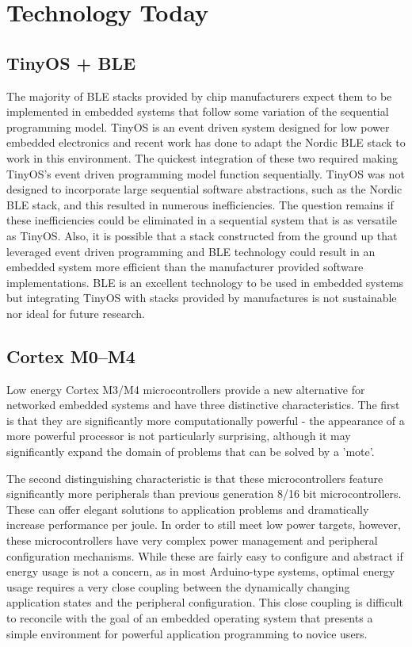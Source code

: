 \section{Technology Today}

\subsection{TinyOS + BLE}

The majority of BLE stacks provided by chip manufacturers expect them to be
implemented in embedded systems that follow some variation of the sequential
programming model.  TinyOS is an event driven system designed for low power
embedded electronics and recent work has done to adapt the Nordic BLE stack to
work in this environment. The quickest integration of these two required
making TinyOS’s event driven programming model function sequentially.  TinyOS
was not designed to incorporate large sequential software abstractions, such
as the Nordic BLE stack, and this resulted in numerous inefficiencies.  The
question remains if these inefficiencies could be eliminated in a sequential
system that is as versatile as TinyOS.  Also, it is possible that a stack
constructed from the ground up that leveraged event driven programming and BLE
technology could result in an embedded system more efficient than the
manufacturer provided software implementations.  BLE is an excellent
technology to be used in embedded systems but integrating TinyOS with stacks
provided by manufactures is not sustainable nor ideal for future research.

\subsection{Cortex M0--M4}

Low energy Cortex M3/M4 microcontrollers provide a new alternative for
networked embedded systems and have three distinctive characteristics. The
first is that they are significantly more computationally powerful - the
appearance of a more powerful processor is not particularly surprising,
although it may significantly expand the domain of problems that can be solved
by a 'mote'.

The second distinguishing characteristic is that these microcontrollers
feature significantly more peripherals than previous generation 8/16 bit
microcontrollers. These can offer elegant solutions to application problems
and dramatically increase performance per joule. In order to still meet low
power targets, however, these microcontrollers have very complex power
management and peripheral configuration mechanisms. While these are fairly
easy to configure and abstract if energy usage is not a concern, as in most
Arduino-type systems, optimal energy usage requires a very close coupling
between the dynamically changing application states and the peripheral
configuration. This close coupling is difficult to reconcile with the goal of
an embedded operating system that presents a simple environment for powerful
application programming to novice users.

